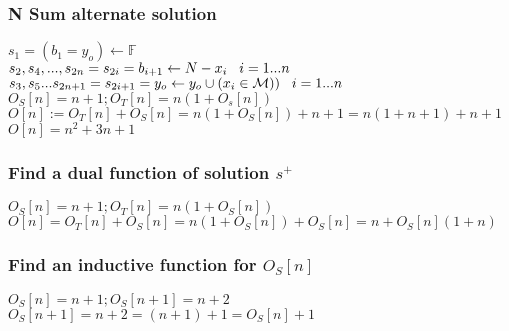 \documentclass[11pt]{article}
\begin{document}
\subsubsection{N Sum alternate solution}
\begin{center}
\vspace{1.5mm}
$
s_1 = (b_1 = y_o) \leftarrow \mathbb{F}
$
\\ \vspace{2mm}
$
s_2,s_4,...,s_{2n} = s_{2i} =  b_{i+1} \leftarrow N - x_i \hspace{3mm} i = 1...n
$
\\ \vspace{2mm}
$
s_3,s_5 ... s_{2n+1} = s_{2i+1} = y_o \leftarrow y_o \cup (x_i \in \mathcal{M})) \hspace{3mm} i = 1...n
$
\\ \vspace{2mm}
$
O_S[n] = n + 1; O_T[n] = n(1 + O_s[n])
$
\\ \vspace{2mm}
$
O[n] := O_T[n] + O_S[n] = n(1 + O_S[n]) + n + 1 = n(1 + n + 1) + n + 1
$
\\ \vspace{2mm}
$
O[n] = n^2 + 3n + 1
$
\end{center}


\subsubsection{Find a dual function of solution $s^+$}
\begin{center}
$
O_S[n] = n + 1; O_T[n] = n(1 + O_S[n])
$
\\ \vspace{2mm}
$
O[n] = O_T[n] + O_S[n] = n(1 + O_S[n]) + O_S[n] = n + O_S[n](1+n)
$
\end{center}

\subsubsection{Find an inductive function for $O_S[n]$}
\begin{center}
$
O_S[n] = n + 1; O_S[n+1] = n+2
$
\\ \vspace{2mm}
$
O_S[n+1] = n + 2 = (n+1) + 1 = O_S[n] + 1
$
\end{center}

\end{document}
